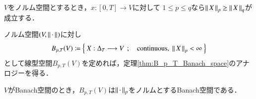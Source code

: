	\begin{screen}
		\begin{thm}
		\label{thm:p_variation_monotonously_decreasing_2}
			$V$をノルム空間とするとき，$x:[0,T] \longrightarrow V$に対して
			$1 \leq p \leq q$なら$\left\|\, X\, \right\|_{p} \geq \left\|\, X\, \right\|_{q}$が成立する．
		\end{thm}
	\end{screen}
	
	ノルム空間$(V,\left\|\, \cdot\, \right\|_{})$に対し
	\begin{align}
		B_{p,T}(V)
		\coloneqq \Set{X:\Delta_T \longrightarrow V}{\mbox{continuous},\ \Norm{X}{p} < \infty}
		\label{def:Banach_space_of_continuous_mapping_on_V}
	\end{align}
	として線型空間$B_{p,T}(V)$を定めれば，定理\ref{thm:B_p_T_Banach_space}のアナロジーを得る．
	
	\begin{screen}
		\begin{thm}\label{thm:B_p_T_Banach_space_2}
			$V$がBanach空間のとき，$B_{p,T}(V)$は$\left\|\, \cdot\, \right\|_{p}$をノルムとするBanach空間である．
		\end{thm}
	\end{screen}

